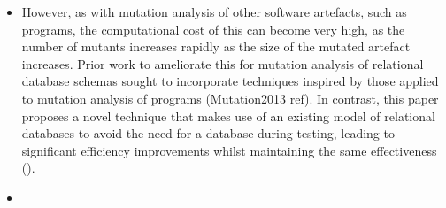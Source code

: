 \begin{itemize}
  \item However, as with mutation analysis of other software artefacts, such as programs, the computational cost of this can become very high, as the number of mutants increases rapidly as the size of the mutated artefact increases. Prior work to ameliorate this for mutation analysis of relational database schemas sought to incorporate techniques inspired by those applied to mutation analysis of programs (Mutation2013 ref). In contrast, this paper proposes a novel technique that makes use of an existing model of relational databases to avoid the need for a database during testing, leading to significant efficiency improvements whilst maintaining the same effectiveness ().

  \item {}

\end{itemize}
